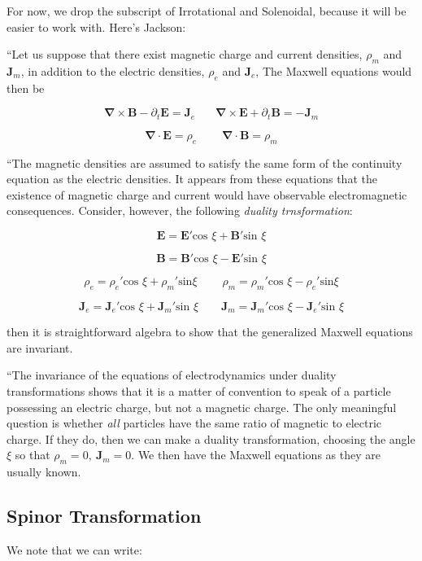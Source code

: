\documentclass {article}
\renewcommand\vec{\mathbf}
\let\OldS\nabla
\renewcommand{\nabla}{\boldsymbol{\OldS}}
\begin{document}
For now, we drop the subscript of Irrotational and Solenoidal, because it will be easier to work with. Here's Jackson:

``Let us suppose that there exist magnetic charge and current densities, $\rho_m$ and $\vec J_m$, in addition  to the electric densities, $\rho_e$ and $\vec J_e$, The Maxwell equations would then be

$$\nabla \times \vec B  - \partial_t \vec E  = \vec J_e  ~~~~~~~~ \nabla \times \vec E + \partial_t \vec B =  - \vec J_m   $$

$$\nabla \cdot \vec E = \rho_e ~~~~~~~~~~ \nabla \cdot \vec B =  \rho_m $$

``The magnetic densities are assumed to satisfy the same form of the continuity equation as the electric densities. It appears from these equations that the existence of magnetic charge and current would have observable electromagnetic consequences. Consider, however, the following \textit{duality trnsformation}:

$$\vec E = \vec E' \text{cos } \xi + \vec B'  \text{sin } \xi$$

$$\vec B = \vec B' \text{cos } \xi - \vec E'  \text{sin } \xi$$

$$\rho_e = \rho_e'  \text{cos } \xi  + \rho_m'  \text{sin} \xi  ~~~~~~~~~~ \rho_m = \rho_m'  \text{cos } \xi  - \rho_e'  \text{sin} \xi $$

$$\vec J_e = \vec J_e' \text{cos } \xi + \vec J_m' \text{sin } \xi ~~~~~~~~~ \vec J_m = \vec J_m' \text{cos } \xi  - \vec J_e' \text{sin } \xi $$

\noindent then it is straightforward algebra to show that the generalized Maxwell equations are invariant.

``The invariance of the equations of electrodynamics under duality transformations shows that it is a matter of convention to speak of a particle possessing an electric charge, but not a magnetic charge. The only meaningful question is whether \textit{all} particles have the same ratio of magnetic to electric charge. If they do, then we can make a duality transformation, choosing the angle $\xi$ so that $\rho_m = 0, ~ \vec J_m = 0$. We then have the Maxwell equations as they are usually known.

\newpage

\subsection{Spinor Transformation}

We note that we can write:
\end{document}
